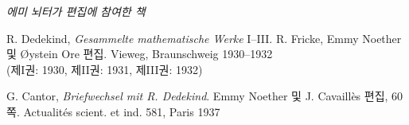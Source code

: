 \clearpage
\begin{center}
\emph{에미 뇌터가 편집에 참여한 책}
\end{center}

\begingroup
\setlength{\parindent}{0pt}
\setlength{\parskip}{0.5em}
R. Dedekind, \emph{Gesammelte mathematische Werke} I--III. R. Fricke, Emmy Noether 및 Øystein Ore 편집. Vieweg, Braunschweig 1930--1932\\
(제I권: 1930, 제II권: 1931, 제III권: 1932)\par
G. Cantor, \emph{Briefwechsel mit R. Dedekind}. Emmy Noether 및 J. Cavaillès 편집, 60쪽. Actualités scient. et ind. 581, Paris 1937\par
\endgroup

